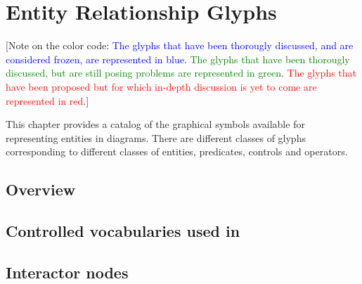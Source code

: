 
\chapter{Entity Relationship Glyphs}

[Note on the color code: \textcolor{blue}{The glyphs that have been thorougly discussed, and are considered frozen, are represented in blue}. \textcolor{green}{The glyphs that have been thorougly discussed, but are still posing problems are represented in green}. \textcolor{red}{The glyphs that have been proposed but for which in-depth discussion is yet to come are represented in red}.]

This chapter provides a catalog of the graphical symbols available for representing entities in \ER diagrams.  There are different classes of glyphs corresponding to different classes of entities, predicates, controls and operators.


\section{Overview}
 

 
\section{Controlled vocabularies used in \SBGNERLone}\label{sec:CVs}

%
 
 
 \section{Interactor nodes}\label{sec:ENs}

